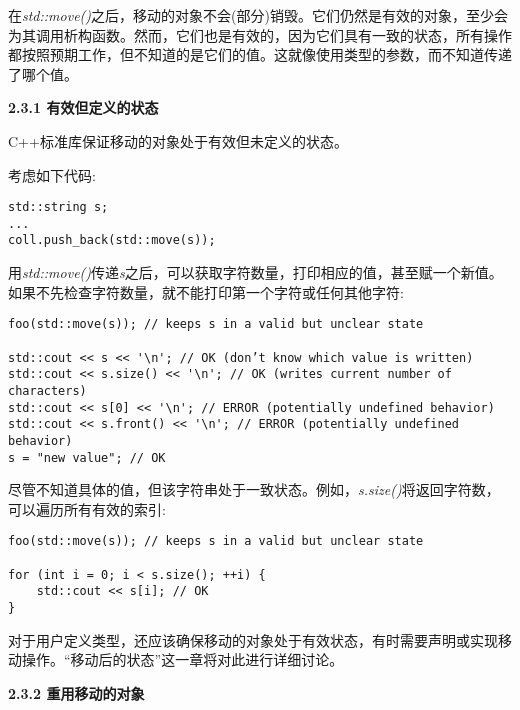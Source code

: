 在\textit{std::move()}之后，移动的对象不会(部分)销毁。它们仍然是有效的对象，至少会为其调用析构函数。然而，它们也是有效的，因为它们具有一致的状态，所有操作都按照预期工作，但不知道的是它们的值。这就像使用类型的参数，而不知道传递了哪个值。\par

\hspace*{\fill} \par %
\textbf{2.3.1 有效但定义的状态}

C++标准库保证移动的对象处于有效但未定义的状态。\par

考虑如下代码:\par

\begin{lstlisting}[caption={}]
std::string s;
...
coll.push_back(std::move(s));
\end{lstlisting}

用\textit{std::move()}传递\textit{s}之后，可以获取字符数量，打印相应的值，甚至赋一个新值。如果不先检查字符数量，就不能打印第一个字符或任何其他字符:\par

\begin{lstlisting}[caption={}]
foo(std::move(s)); // keeps s in a valid but unclear state

std::cout << s << '\n'; // OK (don’t know which value is written)
std::cout << s.size() << '\n'; // OK (writes current number of characters)
std::cout << s[0] << '\n'; // ERROR (potentially undefined behavior)
std::cout << s.front() << '\n'; // ERROR (potentially undefined behavior)
s = "new value"; // OK
\end{lstlisting}

尽管不知道具体的值，但该字符串处于一致状态。例如，\textit{s.size()}将返回字符数，可以遍历所有有效的索引:\par

\begin{lstlisting}[caption={}]
foo(std::move(s)); // keeps s in a valid but unclear state

for (int i = 0; i < s.size(); ++i) {
	std::cout << s[i]; // OK
}
\end{lstlisting}

对于用户定义类型，还应该确保移动的对象处于有效状态，有时需要声明或实现移动操作。“移动后的状态”这一章将对此进行详细讨论。\par

\hspace*{\fill} \par %
\textbf{2.3.2 重用移动的对象}

